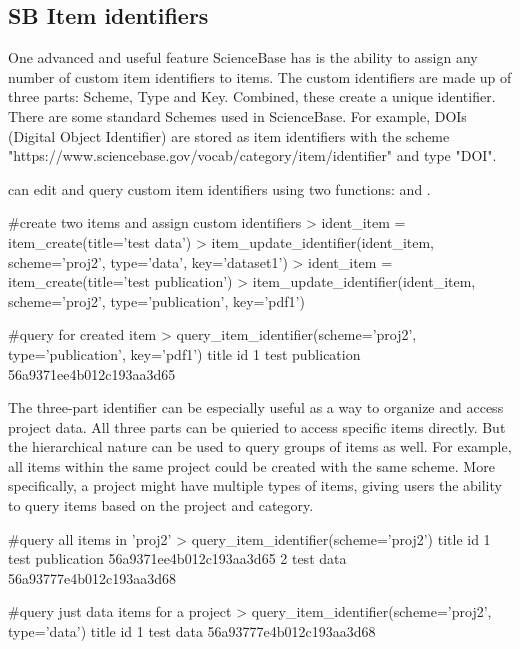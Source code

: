 \subsection{SB Item identifiers}
One advanced and useful feature ScienceBase has is the ability to assign any 
number of custom item identifiers to items. The custom identifiers are made up 
of three parts: Scheme, Type and Key. Combined, these create a unique identifier. 
There are some standard Schemes used in ScienceBase. For example, DOIs (Digital 
Object Identifier) are stored as item identifiers with the scheme 
"https://www.sciencebase.gov/vocab/category/item/identifier" and type "DOI". 

 can edit and query custom item identifiers using two functions:
 and . 

\begin{example}
#create two items and assign custom identifiers
> ident_item = item_create(title='test data')
> item_update_identifier(ident_item, scheme='proj2', type='data', key='dataset1')
> ident_item = item_create(title='test publication')
> item_update_identifier(ident_item, scheme='proj2', type='publication', key='pdf1')

#query for created item
> query_item_identifier(scheme='proj2', type='publication', key='pdf1')
             title                       id
1 test publication 56a9371ee4b012c193aa3d65

\end{example}

The three-part identifier can be especially useful as a way to organize and 
access project data. All three parts can be quieried to access specific items 
directly. But the hierarchical nature can be used to query groups of items as well. 
For example, all items within the same project could be created with the same 
scheme. More specifically, a project might have multiple types of items, giving
users the ability to query items based on the project and category.

\begin{example}
#query all items in 'proj2'
> query_item_identifier(scheme='proj2')
             title                       id
1 test publication 56a9371ee4b012c193aa3d65
2        test data 56a93777e4b012c193aa3d68

#query just data items for a project
> query_item_identifier(scheme='proj2', type='data')
      title                       id
1 test data 56a93777e4b012c193aa3d68

\end{example}


